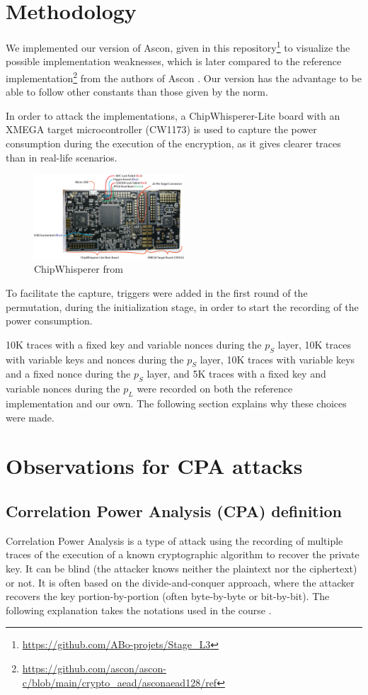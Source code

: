 \documentclass[11pt,technote]{IEEEtran}
\begin{document}
		\section{Methodology}
		We implemented our version of Ascon, given in this repository\footnote{\url{https://github.com/ABo-projets/Stage_L3}} to visualize the possible implementation weaknesses, which is later compared to the reference implementation\footnote{\url{https://github.com/ascon/ascon-c/blob/main/crypto\_aead/asconaead128/ref}} from the authors of Ascon \cite{ascon}. Our version has the advantage to be able to follow other constants than those given by the norm.
		
		In order to attack the implementations, a ChipWhisperer-Lite board with an XMEGA target microcontroller (CW1173) is used to capture the power consumption during the execution of the encryption, as it gives clearer traces than in real-life scenarios.
		
		\begin{figure}[h]
			\includegraphics[width=0.5\textwidth]{img_files/cwlite_basic1}
			\caption{ChipWhisperer from \cite{cwdoc}}
			\label{fig:cw}
		\end{figure}
		
		To facilitate the capture, triggers were added in the first round of the permutation, during the initialization stage, in order to start the recording of the power consumption.
		
		10K traces with a fixed key and variable nonces during the $p_S$ layer, 10K traces with variable keys and nonces during the $p_S$ layer, 10K traces with variable keys and a fixed nonce during the $p_S$ layer, and 5K traces with a fixed key and variable nonces during the $p_L$ were recorded on both the reference implementation and our own. The following section explains why these choices were made.
		
		\section{Observations for CPA attacks}
		\subsection{Correlation Power Analysis (CPA) definition}
		Correlation Power Analysis\cite{cpa_aes} is a type of attack using the recording of multiple traces of the execution of a known cryptographic algorithm to recover the private key. It can be blind (the attacker knows neither the plaintext nor the ciphertext) or not. It is often based on the divide-and-conquer approach, where the attacker recovers the key portion-by-portion (often byte-by-byte or bit-by-bit). The following explanation takes the notations used in the course \cite{cours}.
		
\end{document}

